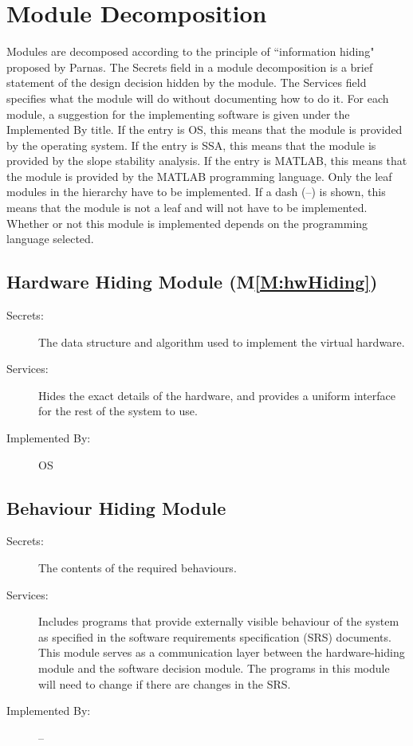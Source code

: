 \documentclass[12pt]{article}
\begin{document}
\section{Module Decomposition}
\label{Sec:ModuDeco}
Modules are decomposed according to the principle of ``information hiding" proposed by Parnas. The Secrets field in a module decomposition is a brief statement of the design decision hidden by the module. The Services field specifies what the module will do without documenting how to do it. For each module, a suggestion for the implementing software is given under the Implemented By title. If the entry is OS, this means that the module is provided by the operating system. If the entry is SSA, this means that the module is provided by the slope stability analysis. If the entry is MATLAB, this means that the module is provided by the MATLAB programming language. Only the leaf modules in the hierarchy have to be implemented. If a dash (--) is shown, this means that the module is not a leaf and will not have to be implemented. Whether or not this module is implemented depends on the programming language selected.
\subsection{Hardware Hiding Module (M\ref{M:hwHiding})}
\label{Sec:HardHidiModu()}
\begin{description}
\item[Secrets:]The data structure and algorithm used to implement the virtual hardware.
\item[Services:]Hides the exact details of the hardware, and provides a uniform interface for the rest of the system to use.
\item[Implemented By:]OS
\end{description}
\subsection{Behaviour Hiding Module}
\label{Sec:BehaHidiModu}
\begin{description}
\item[Secrets:]The contents of the required behaviours.
\item[Services:]Includes programs that provide externally visible behaviour of the system as specified in the software requirements specification (SRS) documents. This module serves as a communication layer between the hardware-hiding module and the software decision module. The programs in this module will need to change if there are changes in the SRS.
\item[Implemented By:]--
\end{description}
\end{document}
